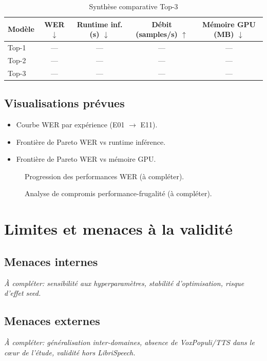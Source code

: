 \documentclass[11pt,a4paper]{article}
\begin{document}
\begin{table}[H]
\centering
\caption{Synthèse comparative Top-3}
\begin{tabular}{lcccc}
\toprule
Modèle & WER $\downarrow$ & Runtime inf. (s) $\downarrow$ & Débit (samples/s) $\uparrow$ & Mémoire GPU (MB) $\downarrow$ \\
\midrule
Top-1 & --- & --- & --- & --- \\
Top-2 & --- & --- & --- & --- \\
Top-3 & --- & --- & --- & --- \\
\bottomrule
\end{tabular}
\end{table}

\subsection{Visualisations prévues}
\begin{itemize}
\item Courbe WER par expérience (E01 $\rightarrow$ E11).
\item Frontière de Pareto WER vs runtime inférence.
\item Frontière de Pareto WER vs mémoire GPU.
\end{itemize}

\begin{figure}[H]
\centering
{}
\caption{Progression des performances WER (à compléter).}
\end{figure}

\begin{figure}[H]
\centering
{}
\caption{Analyse de compromis performance-frugalité (à compléter).}
\end{figure}


\section{Limites et menaces à la validité}
\subsection{Menaces internes}
\textit{À compléter: sensibilité aux hyperparamètres, stabilité d'optimisation, risque d'effet seed.}

\subsection{Menaces externes}
\textit{À compléter: généralisation inter-domaines, absence de VoxPopuli/TTS dans le cœur de l'étude, validité hors LibriSpeech.}
\end{document}
